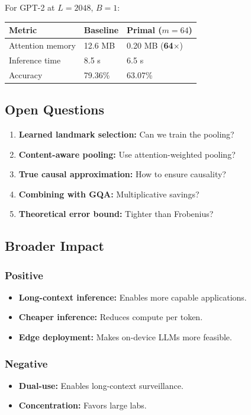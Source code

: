 For GPT-2 at $L = 2048$, $B = 1$:

\begin{table}[H]
\centering
\small
\begin{tabular}{lll}
\toprule
\textbf{Metric} & \textbf{Baseline} & \textbf{Primal ($m=64$)} \\
\midrule
Attention memory & 12.6 MB & 0.20 MB (\textbf{64$\times$}) \\
Inference time & 8.5 s & 6.5 s \\
Accuracy & 79.36\% & 63.07\% \\
\bottomrule
\end{tabular}
\end{table}

\subsection{Open Questions}

\begin{enumerate}
\item \textbf{Learned landmark selection:} Can we train the pooling?
\item \textbf{Content-aware pooling:} Use attention-weighted pooling?
\item \textbf{True causal approximation:} How to ensure causality?
\item \textbf{Combining with GQA:} Multiplicative savings?
\item \textbf{Theoretical error bound:} Tighter than Frobenius?

\end{enumerate}
\subsection{Broader Impact}

\subsubsection{Positive}
\begin{itemize}
\item \textbf{Long-context inference:} Enables more capable applications.
\item \textbf{Cheaper inference:} Reduces compute per token.
\item \textbf{Edge deployment:} Makes on-device LLMs more feasible.

\end{itemize}
\subsubsection{Negative}
\begin{itemize}
\item \textbf{Dual-use:} Enables long-context surveillance.
\item \textbf{Concentration:} Favors large labs.

\end{itemize}
